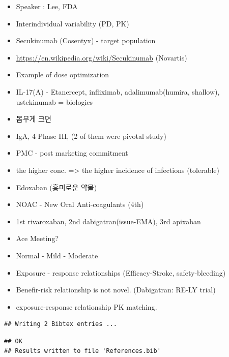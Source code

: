 \documentclass[]{book}
\providecommand{\tightlist}{%
  \setlength{\itemsep}{0pt}\setlength{\parskip}{0pt}}
\begin{document}
\begin{itemize}
\tightlist
\item
  Speaker : Lee, FDA
\item
  Interindividual variability (PD, PK)
\item
  Secukinumab (Cosentyx) - target population
\item
  \url{https://en.wikipedia.org/wiki/Secukinumab} (Novartis)
\item
  Example of dose optimization
\item
  IL-17(A) - Etanercept, infliximab, adalimumab(humira, shallow),
  ustekinumab = biologics
\item
  몸무게 크면
\item
  IgA, 4 Phase III, (2 of them were pivotal study)
\item
  PMC - post marketing commitment
\item
  the higher conc. =\textgreater{} the higher incidence of infections
  (tolerable)
\item
  Edoxaban (흥미로운 약물)
\item
  NOAC - New Oral Anti-coagulants (4th)
\item
  1st rivaroxaban, 2nd dabigatran(issue-EMA), 3rd apixaban
\item
  Ace Meeting?
\item
  Normal - Mild - Moderate
\item
  Exposure - response relationships (Efficacy-Stroke, safety-bleeding)
\item
  Benefir-risk relationship is not novel. (Dabigatran: RE-LY trial)
\item
  exposure-response relationship PK matching.
\end{itemize}

\begin{verbatim}
## Writing 2 Bibtex entries ...
\end{verbatim}

\begin{verbatim}
## OK
## Results written to file 'References.bib'
\end{verbatim}


\end{document}
